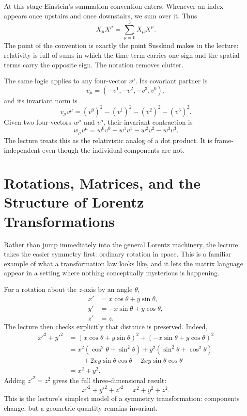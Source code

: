 At this stage Einstein's summation convention enters. Whenever an index appears once upstairs and once downstairs, we sum over it. Thus
\begin{equation}
X_\mu X^\mu = \sum_{\mu=0}^{3} X_\mu X^\mu.
\end{equation}
The point of the convention is exactly the point Susskind makes in the lecture: relativity is full of sums in which the time term carries one sign and the spatial terms carry the opposite sign. The notation removes clutter.

The same logic applies to any four-vector \(v^\mu\). Its covariant partner is
\begin{equation}
v_\mu = (-v^1,-v^2,-v^3,v^0),
\end{equation}
and its invariant norm is
\begin{equation}
v_\mu v^\mu = (v^0)^2 - (v^1)^2 - (v^2)^2 - (v^3)^2.
\end{equation}
Given two four-vectors \(w^\mu\) and \(v^\mu\), their invariant contraction is
\begin{equation}
w_\mu v^\mu = w^0v^0 - w^1v^1 - w^2v^2 - w^3v^3.
\end{equation}
The lecture treats this as the relativistic analog of a dot product. It is frame-independent even though the individual components are not.

\section{Rotations, Matrices, and the Structure of Lorentz Transformations}

Rather than jump immediately into the general Lorentz machinery, the lecture takes the easier symmetry first: ordinary rotation in space. This is a familiar example of what a transformation law looks like, and it lets the matrix language appear in a setting where nothing conceptually mysterious is happening.

For a rotation about the \(z\)-axis by an angle \(\theta\),
\begin{align}
x' &= x\cos\theta + y\sin\theta, \\
y' &= -x\sin\theta + y\cos\theta, \\
z' &= z.
\end{align}
The lecture then checks explicitly that distance is preserved. Indeed,
\begin{align}
x'^2+y'^2
&= (x\cos\theta+y\sin\theta)^2 + (-x\sin\theta+y\cos\theta)^2 \\
&= x^2(\cos^2\theta+\sin^2\theta)
   + y^2(\sin^2\theta+\cos^2\theta) \nonumber\\
&\qquad + 2xy\sin\theta\cos\theta - 2xy\sin\theta\cos\theta \\
&= x^2+y^2.
\end{align}
Adding \(z'^2=z^2\) gives the full three-dimensional result:
\begin{equation}
x'^2+y'^2+z'^2 = x^2+y^2+z^2.
\end{equation}
This is the lecture's simplest model of a symmetry transformation: components change, but a geometric quantity remains invariant.

